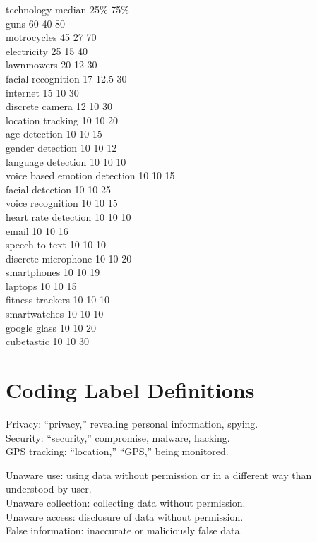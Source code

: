 \documentclass{acm_proc_article-sp}
\begin{document}
technology 	median	25\%		75\%\\
guns	60	40	80\\
motrocycles	45	27	70\\
electricity	25	15	40\\
lawnmowers	20	12	30\\
facial recognition	17	12.5	30\\
internet	15	10	30\\
discrete camera	12	10	30\\
location tracking	10	10	20\\
age detection	10	10	15\\
gender detection	10	10	12\\
language detection	10	10	10\\
voice based emotion detection	10	10	15\\
facial detection	10	10	25\\
voice recognition	10	10	15\\
heart rate detection	10	10	10\\
email	10	10	16\\
speech to text	10	10	10\\
discrete microphone	10	10	20\\
smartphones	10	10	19\\
laptops	10	10	15\\
fitness trackers	10	10	10\\
smartwatches	10	10	10\\
google glass	10	10	20\\
cubetastic	10	10	30

\section{Coding Label Definitions}
\label{sec:coding}

Privacy: ``privacy,'' revealing personal information, spying. \\
Security:  ``security,'' compromise, malware, hacking. \\
GPS tracking: ``location,'' ``GPS,'' being monitored. 

Unaware use: using data without permission or in a different way than understood by user. \\
Unaware collection: collecting data without permission. \\
Unaware access: disclosure of data without permission. \\
False information: inaccurate or maliciously false data.
\end{document}
